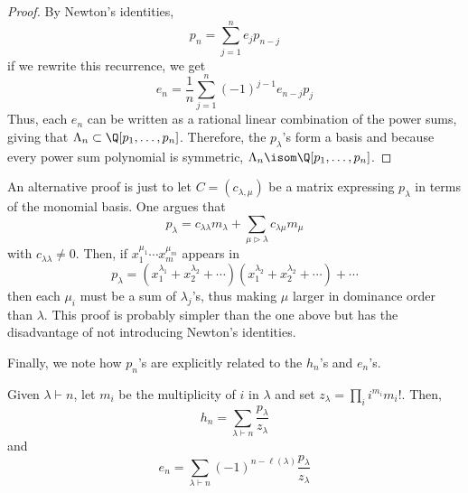 \documentclass[11pt,leqno,oneside]{amsart}
\numberwithin{thm}{section}
\newcommand{\partitionof}{\vdash}
\newcommand{\strictlydominates}{\mathrel{\rhd}}
\newcommand{\sym}{\Lambda}
\begin{document}
\begin{proof}
  By Newton's identities, \[
    p_n = \sum_{j=1}^n e_j p_{n-j}
  \]
  if we rewrite this recurrence, we get \[
    e_n = \frac{1}{n}\sum_{j=1}^n (-1)^{j-1} e_{n-j} p_j
  \]
  Thus, each \(e_n\) can be written as a rational linear combination
  of the power sums, giving that \(\sym_n \subset \Q[p_1, \ldots,
  p_n]\). Therefore, the \(p_\lambda\)'s form a basis and because
  every power sum polynomial is symmetric, \(\sym_n \isom \Q[p_1,
  \ldots, p_n]\).
\end{proof}
\begin{rmk}
  An alternative proof is just to let \(C=(c_{\lambda,\mu})\) be a
  matrix expressing \(p_\lambda\) in terms of the monomial basis. One
  argues that \[
    p_{\lambda} = c_{\lambda \lambda}m_{\lambda} + \sum_{\mu
      \strictlydominates \lambda} c_{\lambda \mu} m_{\mu}
  \]
  with \(c_{\lambda \lambda} \neq 0\). Then, if \(x_1^{\mu_1} \cdots
  x_m^{\mu_m}\) appears in \[
    p_\lambda = (x_1^{\lambda_1} + x_2^{\lambda_2} +
    \cdots)(x_1^{\lambda_2}+x_2^{\lambda_2}+ \cdots )+\cdots
  \]
  then each \(\mu_i\) must be a sum of \(\lambda_j\)'s, thus making
  \(\mu\) larger in dominance order than \(\lambda\). This proof is
  probably simpler than the one above but has the disadvantage of not
  introducing Newton's identities.
\end{rmk}
Finally, we note how \(p_n\)'s are explicitly related to the \(h_n\)'s
and \(e_n\)'s.
\begin{prop}\label{hn-in-terms-of-pn}
  Given \(\lambda \partitionof n\), let \(m_i\) be the
    multiplicity of \(i\) in \(\lambda\) and set \(z_\lambda = \prod_i
    i^{m_i} m_i!\). Then,
    \[
      h_n = \sum_{\lambda \partitionof n} \frac{p_\lambda}{z_\lambda}
    \]
    and \[
      e_n = \sum_{\lambda \partitionof n} (-1)^{n-\ell(\lambda)}
      \frac{p_\lambda}{z_\lambda} 
    \]
\end{prop}
\end{document}
